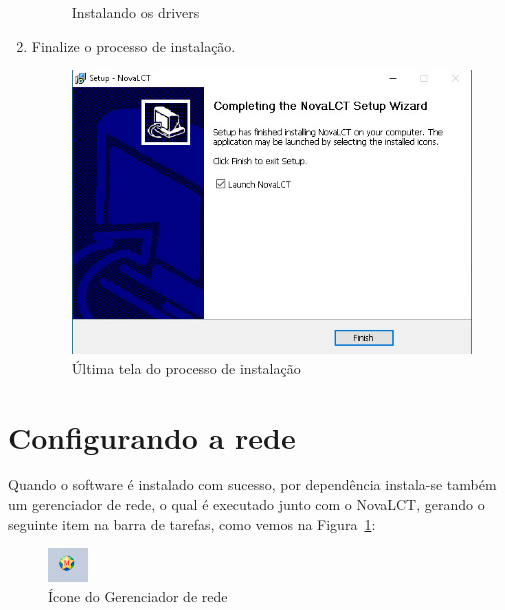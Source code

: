 \documentclass[12pt, a4paper]{article}
\begin{document}
\begin{enumerate}
\begin{figure}[!htb]
			\caption{Instalando os drivers}
		\end{figure}
		\newpage
	\item Finalize o processo de instalação.
		\begin{figure}[!htb]
			\centering
			\includegraphics[width=.8\textwidth]{DEnd.jpeg}
			\caption{Última tela do processo de instalação}
		\end{figure}
\end{enumerate}

		\newpage
\section{Configurando a rede}\label{Configurando a rede}

Quando o software é instalado com sucesso, por dependência instala-se também um gerenciador de rede, o qual é executado junto com o NovaLCT, gerando o seguinte item na barra de tarefas, como vemos na Figura~\ref{fig:barra_de_tarefas.jpeg}:
\begin{figure}[!htb]
	\centering
	\includegraphics{barra_de_tarefas.jpeg}
	\caption{\label{fig:barra_de_tarefas.jpeg}Ícone do Gerenciador de rede}
\end{figure}
\end{document}
